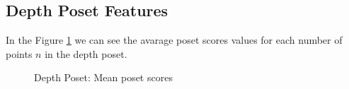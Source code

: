 \documentclass{article}
\begin{document}
\subsection{Depth Poset Features}
\par In the Figure \ref{fig:scores_poset_mean} we can see the avarage poset scores values for each number of points $n$ in the depth poset.
\begin{figure}[ht]
  \vspace{-96pt}
  \centering
  \hspace*{-0.18999999999999995\textwidth}
  \caption{Depth Poset: Mean poset scores}
  \label{fig:scores_poset_mean}
\end{figure}
\end{document}

